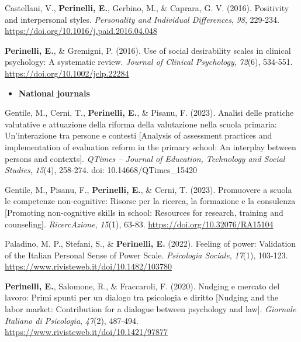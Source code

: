 \documentclass[hidelinks, letterpaper,10pt]{article} %
\begin{document}
\begin{etaremune}
\item Castellani, V., \textbf{Perinelli, E.}, Gerbino, M., \& Caprara, G. V. (2016). Positivity and interpersonal styles. \textit{Personality and Individual Differences}, \textit{98}, 229-234. \url{https://doi.org/10.1016/j.paid.2016.04.048} 

\item \textbf{Perinelli, E.}, \& Gremigni, P. (2016). Use of social desirability scales in clinical psychology: A systematic review. \textit{Journal of Clinical Psychology}, \textit{72}(6), 534-551. \url{https://doi.org/10.1002/jclp.22284} 

	\end{etaremune}
\vspace{3mm}

\begin{itemize}
	\setlength{\topsep}{0pt}%
	\setlength{\leftmargin}{0.1in}%
	\setlength{\listparindent}{-0.1in}%
	\setlength{\itemindent}{-0.2in}%
	\setlength{\parsep}{\parskip}%
	
	\item {\textbf{\large{National journals}}}
\end{itemize}
\begin{etaremune}

	\item Gentile, M., Cerni, T., \textbf{Perinelli, E.}, \& Pisanu, F. (2023). Analisi delle pratiche valutative e attuazione della riforma della valutazione nella scuola primaria: Un’interazione tra persone e contesti [Analysis of assessment practices and implementation of evaluation reform in the primary school: An interplay between persons and contexts]. \textit{QTimes – Journal of Education, Technology and Social Studies}, \textit{15}(4), 258-274. doi: 10.14668/QTimes\_15420

	\item Gentile, M., Pisanu, F., \textbf{Perinelli, E.}, \& Cerni, T. (2023). Promuovere a scuola le competenze non-cognitive: Risorse per la ricerca, la formazione e la consulenza [Promoting non-cognitive skills in school: Resources for research, training and counseling]. \textit{RicercAzione}, \textit{15}(1), 63-83. \url{https://doi.org/10.32076/RA15104}

	\item Paladino, M. P., Stefani, S., \& \textbf{Perinelli, E.} (2022). Feeling of power: Validation of the Italian Personal Sense of Power Scale. \textit{Psicologia Sociale}, \textit{17}(1), 103-123. \url{https://www.rivisteweb.it/doi/10.1482/103780}

	\item \textbf{Perinelli, E.}, Salomone, R., \& Fraccaroli, F. (2020). Nudging e mercato del lavoro: Primi spunti per un dialogo tra psicologia e diritto [Nudging and the labor market: Contribution for a dialogue between psychology and law]. \textit{Giornale Italiano di Psicologia}, \textit{47}(2), 487-494. \url{https://www.rivisteweb.it/doi/10.1421/97877}
\end{etaremune}
\vspace{3mm}
\end{document}
